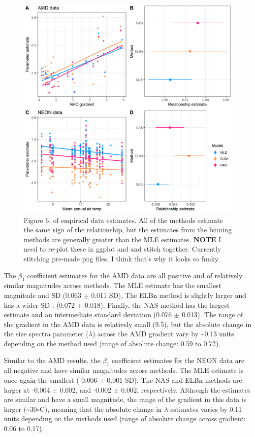 \documentclass[
]{article}
\begin{document}
\newpage

\begin{figure}
\centering
\includegraphics{figures/empirical_combined.png}
\caption{Figure 6. of empirical data estimates. All of the methods
estimate the same sign of the relationship, but the estimates from the
binning methods are generally greater than the MLE estimates.
\textbf{NOTE} I need to re-plot these in ggplot and and stitch together.
Currently stitching pre-made png files, I think that's why it looks so
funky.}
\end{figure}

\newpage

The \(\beta_1\) coefficient estimates for the AMD data are all positive
and of relatively similar magnitudes across methods. The MLE estimate
has the smallest magnitude and SD (0.063 \(\pm\) 0.011 SD), The ELBn
method is slightly larger and has a wider SD : (0.072 \(\pm\) 0.018).
Finally, the NAS method has the largest estimate and an intermediate
standard deviation (0.076 \(\pm\) 0.013). The range of the gradient in
the AMD data is relatively small (9.5), but the absolute change in the
size spectra parameter (\(\lambda\)) across the AMD gradient vary by
\textasciitilde0.13 units depending on the method used (range of
absolute change: 0.59 to 0.72).

Similar to the AMD results, the \(\beta_1\) coefficient estimates for
the NEON data are all negative and have similar magnitudes across
methods. The MLE estimate is once again the smallest (-0.006 \(\pm\)
0.001 SD). The NAS and ELBn methods are larger at -0.004 \(\pm\) 0.002,
and -0.002 \(\pm\) 0.002, respectively. Although the estimates are
similar and have a small magnitude, the range of the gradient in this
data is larger (\textasciitilde30\(\circ\)C), meaning that the absolute
change in \(\lambda\) estimates varies by 0.11 units depending on the
methods used (range of absolute change across gradient: 0.06 to 0.17).
\end{document}
